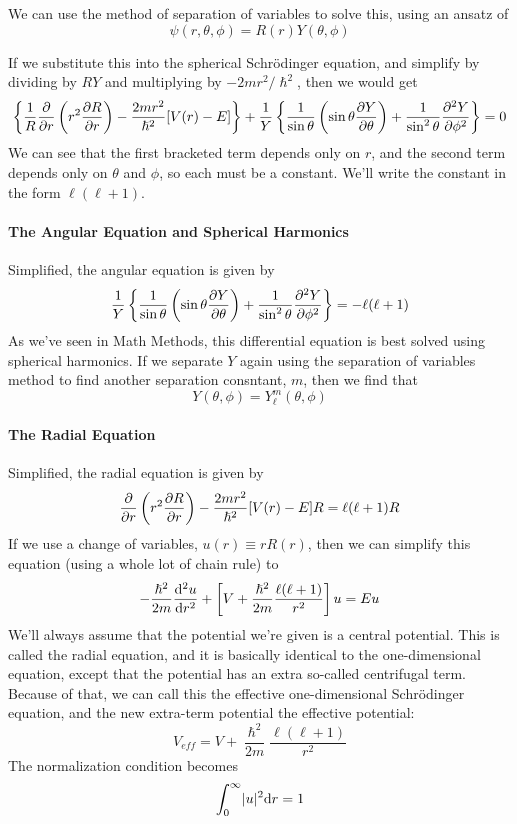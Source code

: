 \documentclass[a4paper]{article}
\begin{document}
We can use the method of separation of variables to solve this, using an
ansatz of
\[ \psi(r,\theta,\phi) = R(r)Y(\theta,\phi) \]

If we substitute this into the spherical Schr\"odinger equation, and simplify
by dividing by $RY$ and multiplying by $-2mr^2/\hslash^2$, then we would get
\[
	\left\{\frac{1}{R}\pd{r}\left(r^2\pder{R}{r}\right)-
	\frac{2mr^2}{\hslash^2}[V(r)-E]\right\} +
	\frac{1}{Y}\left\{\frac{1}{\sin\theta}\left(\sin\theta\pder{Y}{\theta}
	\right)+\frac{1}{\sin^2\theta}\pder{^2Y}{\phi^2}\right\}
	=0
\]
We can see that the first bracketed term depends only on $r$, and the second
term depends only on $\theta$ and $\phi$, so each must be a constant. We'll
write the constant in the form $\ell(\ell+1)$.

\paragraph{The Angular Equation and Spherical Harmonics}
Simplified, the angular equation is given by
\[
	\frac{1}{Y}\left\{\frac{1}{\sin\theta}\left(\sin\theta\frac{\partial Y}{\partial \theta}
	\right)+\frac{1}{\sin^2\theta}\frac{\partial ^2Y}{\partial \phi^2}\right\}=-\ell(\ell+1)
\]
As we've seen in Math Methods, this differential equation is best solved using
spherical harmonics. If we separate $Y$ again using the separation of variables
method to find another separation consntant, $m$, then we find that
\[ Y(\theta,\phi) = Y_\ell^m(\theta,\phi) \]

\paragraph{The Radial Equation}
Simplified, the radial equation is given by
\[
	\pd{r}\left(r^2\pder{R}{r}\right)-\frac{2mr^2}{\hslash^2}[V(r)-E]R
	= \ell(\ell+1)R
\]
If we use a change of variables, $u(r)\equiv rR(r)$, then we can simplify this
equation (using a whole lot of chain rule) to
\begin{align*}
	-\frac{\hslash^2}{2m}\frac{\mathrm{d} ^2u}{\mathrm{d} r^2}+\left[V+\frac{\hslash^2}{2m}
	\frac{\ell(\ell+1)}{r^2}\right]u=Eu
\end{align*}
We'll always assume that the potential we're given is a central potential.
This is called the radial equation, and it is basically identical to the
one-dimensional equation, except that the potential has an extra so-called
centrifugal term. Because of that, we can call this the effective
one-dimensional Schr\"odinger equation, and the new extra-term potential
the effective potential:
\[ V_{eff}=V+\frac{\hslash^2}{2m}\frac{\ell(\ell+1)}{r^2} \]
The normalization condition becomes
\[ \int_0^\infty \lvert u \rvert^2\mathrm{d} r=1 \]
\end{document}

